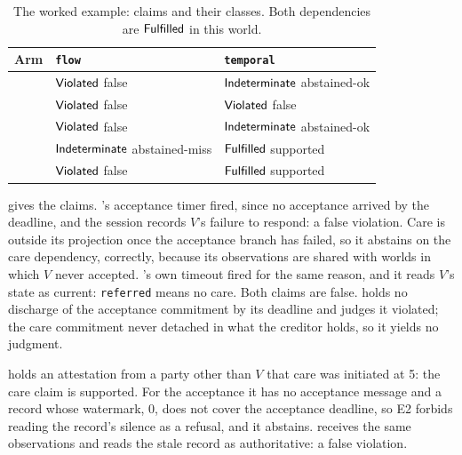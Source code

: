 \begin{table}[t]
\centering
\caption{The worked example: claims and their classes. Both dependencies are $\Ful$ in this world.}
\label{tab:example}
\footnotesize
\setlength{\tabcolsep}{3pt}
\begin{tabular}{@{}L{17mm}L{29mm}L{29mm}@{}}
\toprule
Arm & \texttt{flow} & \texttt{temporal} \\
\midrule
{} & $\mathsf{Violated}$ \newline false & $\mathsf{Indeterminate}$ \newline abstained-ok \\
 & $\mathsf{Violated}$ \newline false & $\mathsf{Violated}$ \newline false \\
 & $\mathsf{Violated}$ \newline false & $\mathsf{Indeterminate}$ \newline abstained-ok \\
 & $\mathsf{Indeterminate}$ \newline abstained-miss & $\Ful$ \newline supported \\
 & $\mathsf{Violated}$ \newline false & $\Ful$ \newline supported \\
\bottomrule
\end{tabular}
\end{table}

 gives the claims. 's acceptance timer fired, since no acceptance arrived by the deadline, and the session records $V$'s failure to respond: a false violation. Care is outside its projection once the acceptance branch has failed, so it abstains on the care dependency, correctly, because its observations are shared with worlds in which $V$ never accepted. 's own timeout fired for the same reason, and it reads $V$'s state as current: \texttt{referred} means no care. Both claims are false.  holds no discharge of the acceptance commitment by its deadline and judges it violated; the care commitment never detached in what the creditor holds, so it yields no judgment.

 holds an attestation from a party other than $V$ that care was initiated at 5: the care claim is supported. For the acceptance it has no acceptance message and a record whose watermark, 0, does not cover the acceptance deadline, so E2 forbids reading the record's silence as a refusal, and it abstains.  receives the same observations and reads the stale record as authoritative: a false violation.

